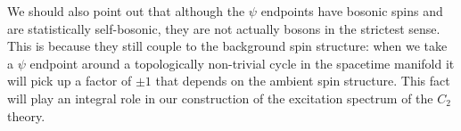 \documentclass[12pt,a4paper]{article}
\newcommand{\ethan}[1]{{\color{amethyst}\footnotesize{(EL) #1}}}
\newcommand{\PsiEnd}{\mathord{\vcenter{\hbox{\texttt{[image: PsiEnd.pdf]}}}}}
\begin{document}
We should also point out that although the $\psi$ endpoints have bosonic 
spins and are statistically self-bosonic, they are not actually bosons in the strictest sense. 
This is because they still couple to the background spin structure: 
when we take a $\psi$ endpoint around a topologically non-trivial cycle in the 
spacetime manifold it will pick up a factor of $\pm1$ that depends on the ambient spin structure. 
This fact will play an integral role in our construction of the excitation spectrum of the $C_2$ theory. 

\end{document}
